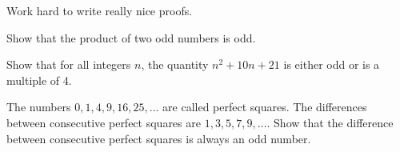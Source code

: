 \yourname


\noindent Work hard to write really nice proofs.

\blist{3.5in}
\item Show that the product of two odd numbers is odd.

\item Show that for all integers $n$, the quantity $n^2 + 10n + 21$ is either odd or is a multiple of 4.

\item The numbers $0, 1, 4, 9, 16, 25, \ldots$ are called perfect squares.  The differences between consecutive perfect squares are $1, 3, 5, 7, 9, \ldots$.
Show that the difference between consecutive perfect squares is always an odd number.


\elist
\vfill          %
